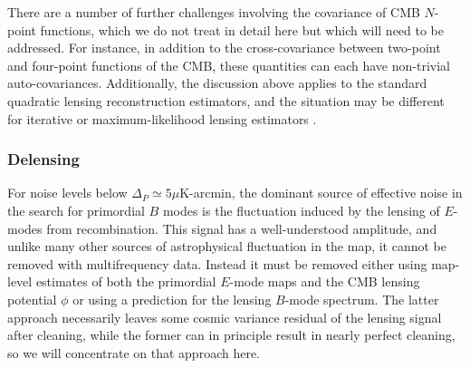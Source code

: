 There are a number of further challenges involving the covariance of CMB $N$-point functions, which 
we do not treat in detail here but which will need to be addressed. For instance,
in addition to the cross-covariance between two-point and four-point functions of the CMB, these quantities can each have non-trivial auto-covariances.  
Additionally, the discussion above applies to the standard quadratic lensing reconstruction estimators, and the situation may be different for iterative or maximum-likelihood lensing estimators \cite{Hirata:2002jy}.

\subsubsection{Delensing}
For noise levels below $\Delta_P \simeq 5 \mu$K-arcmin,  the dominant source of effective noise in the search for primordial $B$ modes is the fluctuation induced by the lensing of $E$-modes from recombination.  This signal has a well-understood amplitude, and unlike many other sources of astrophysical fluctuation in the map, it cannot be removed with multifrequency data.  Instead it must be removed either using map-level estimates of both the primordial $E$-mode maps and the CMB lensing potential $\phi$ or using a prediction for the lensing $B$-mode spectrum. The latter approach necessarily leaves some cosmic variance residual of the lensing signal after cleaning, while the former can in principle result in nearly perfect cleaning, so we will concentrate on that approach here.


